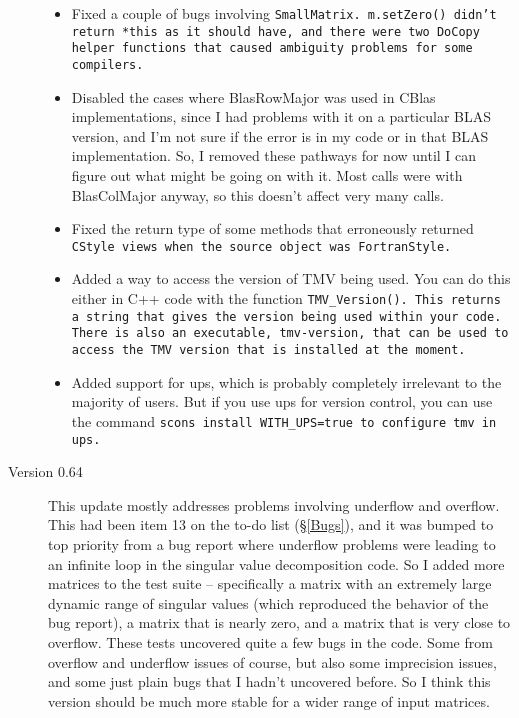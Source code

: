 \begin{description}
\begin{itemize}
\item
Fixed a couple of bugs involving \tt{SmallMatrix}.  
\tt{m.setZero()} didn't return \tt{*this} as it should have,
and there were two \tt{DoCopy} helper functions that caused 
ambiguity problems for some compilers.

\item
Disabled the cases where BlasRowMajor was used in CBlas implementations, 
since I had problems
with it on a particular BLAS version, and I'm not sure if the error
is in my code or in that BLAS implementation.
So, I removed these pathways for now until I can figure out what might
be going on with it.  Most calls were with BlasColMajor anyway, so this
doesn't affect very many calls.

\item
Fixed the return type of some methods that erroneously returned \tt{CStyle}
views when the source object was \tt{FortranStyle}.

\item
Added a way to access the version of TMV being used.
You can do this either in C++ code with the function \tt{TMV\_Version()}.
This returns a string that gives the version being used within your code.
There is also an executable, \tt{tmv-version}, that can be used to access
the TMV version that is installed at the moment.

\item
Added support for ups, which is probably completely irrelevant
to the majority of users.  But if you use ups for version control, you can
use the command \tt{scons install WITH\_UPS=true} to configure tmv in ups.

\end{itemize}

\item[Version 0.64]
This update mostly addresses problems involving underflow and overflow.  This had 
been item 13 on the to-do list (\S\ref{Bugs}), and it was bumped to top priority from
a bug report where underflow problems were leading to an infinite loop in the 
singular value decomposition code.  So I added more matrices to the test suite -- 
specifically a matrix with an extremely large dynamic range of singular values
(which reproduced the behavior of the bug report), a matrix that is nearly zero,
and a matrix that is very close to overflow.  These tests uncovered quite a few bugs 
in the code.  Some from overflow and underflow issues of course, but also some
imprecision issues, and some just plain bugs that I hadn't uncovered before.  So 
I think this version should be much more stable for a wider range of input matrices.


\end{description}
